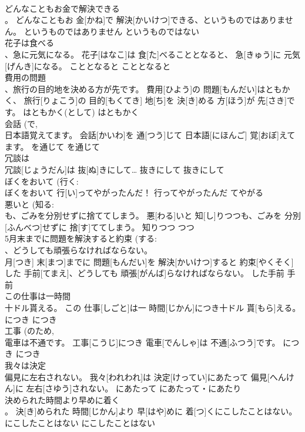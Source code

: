 \documentclass[8pt]{extreport}
\begin{document}
\begin{CJK}{UTF8}{min}
\\	どんなこともお金で解決できる 
\\	。	どんなこともお 金[かね]で 解決[かいけつ]できる、というものではありません。	というものではありません	というものではない	
\\	花子は食べる 
\\	、急に元気になる。	花子[はなこ]は 食[た]べることとなると、 急[きゅう]に 元気[げんき]になる。	こととなると	こととなると	
\\	費用の問題 
\\	、旅行の目的地を決める方が先です。	費用[ひよう]の 問題[もんだい]はともかく、 旅行[りょこう]の 目的[もくてき] 地[ち]を 決[き]める 方[ほう]が 先[さき]です。	はともかく(として)	はともかく	
\\	会話 (で, 
\\	日本語覚えてます。	会話[かいわ]を 通[つう]じて 日本語[にほんご] 覚[おぼ]えてます。	を通じて	を通じて	
\\	冗談は 
\\	冗談[じょうだん]は 抜[ぬ]きにして…	抜きにして	抜きにして	
\\	ぼくをおいて (行く: 
\\	ぼくをおいて 行[い]ってやがったんだ！	行ってやがったんだ	てやがる	
\\	悪いと (知る: 
\\	も、ごみを分別せずに捨ててしまう。	悪[わる]いと 知[し]りつつも、ごみを 分別[ふんべつ]せずに 捨[す]ててしまう。	知りつつ	つつ	
\\	5月末までに問題を解決すると約束 (する: 
\\	、どうしても頑張らなければならない。	
\\	月[つき] 末[まつ]までに 問題[もんだい]を 解決[かいけつ]すると 約束[やくそく]した 手前[てまえ]、どうしても 頑張[がんば]らなければならない。	した手前	手前	
\\	この仕事は一時間 
\\	十ドル貰える。	この 仕事[しごと]は一 時間[じかん]につき十ドル 貰[もら]える。	につき	につき	
\\	工事 (のため, 
\\	電車は不通です。	工事[こうじ]につき 電車[でんしゃ]は 不通[ふつう]です。	につき	につき	
\\	我々は決定 
\\	偏見に左右されない。	我々[われわれ]は 決定[けってい]にあたって 偏見[へんけん]に 左右[さゆう]されない。	にあたって	にあたって・にあたり	
\\	決められた時間より早めに着く 
\\	。	決[き]められた 時間[じかん]より 早[はや]めに 着[つ]くにこしたことはない。	にこしたことはない	にこしたことはない	

\end{CJK}
\end{document}
